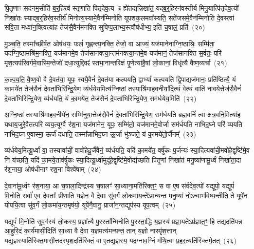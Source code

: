 पि॒तृ॒णाꣳ सद॑नम॒सीति॑ ब॒र्॒\mbox{}हिरव॑ स्तृणाति पितृदेव॒त्य ꣴ॒ ह्ये॑तद्यन्निखा॑तं॒ यद्ब॒र्॒\mbox{}हिरन॑वस्तीर्य मिनु॒यात्पि॑तृदेव॒त्यो॑ निखा॑तः स्याद्ब॒र्॒\mbox{}हिर॑व॒स्तीर्य॑ मिनोत्य॒स्यामे॒वैन॑म्मिनोति यूपशक॒लमवा᳚स्यति॒ सते॑जसमे॒वैन॑म्मिनोति दे॒वस्त्वा॑ सवि॒ता मध्वा॑न॒क्त्वित्या॑ह॒ तेज॑सै॒वैन॑मनक्ति सुपिप्प॒लाभ्य॒स्त्वौष॑धीभ्य॒ इति॑ च॒षालं॒ प्रति॑~(२०)

मु॒ञ्च॒ति॒ तस्मा᳚च्छीर्\mbox{}ष॒त ओष॑धयः॒ फलं॑ गृह्णन्त्य॒नक्ति॒ तेजो॒ वा आज्यं॒ यज॑मानेनाग्नि॒ष्ठाश्रिः॒ सम्मि॑ता॒ यद॑ग्नि॒ष्ठा\-मश्रि॑म॒नक्ति॒ यज॑मानमे॒व तेज॑सानक्त्या॒न्तम॑नक्त्या॒न्तमे॒व यज॑मानं॒ तेज॑सानक्ति स॒र्वतः॒ परि॑ मृश॒त्यप॑रिवर्गमे॒वा\-स्मि॒न्तेजो॑ दधा॒त्युद्दिवꣴ॑ स्तभा॒नान्तरि॑क्षं पृ॒णेत्या॑है॒षां लो॒कानां॒ विधृ॑त्यै वैष्ण॒व्यर्चा~(२१)

क॒ल्प॒य॒ति॒ वै॒ष्ण॒वो वै दे॒वत॑या॒ यूपः॒ स्वयै॒वैनं॑ दे॒वत॑या कल्पयति॒ द्वा\-भ्यां᳚ कल्पयति द्वि॒पाद्यज॑मानः॒ प्रति॑ष्ठित्यै॒ यं का॒मये॑त॒ तेज॑सैनं दे॒वता॑भिरिन्द्रि॒येण॒ व्य॑र्धयेय॒मित्य॑ग्नि॒ष्ठां तस्याश्रि॑माहव॒नीया॑दि॒त्थं वे॒त्थं वाति॑ नावये॒त्तेज॑सै॒वैनं॑ दे॒वता॑भिरिन्द्रि॒येण॒ व्य॑र्धयति॒ यं का॒मये॑त॒ तेज॑सैनं दे॒वता॑भिरिन्द्रि॒येण॒ सम॑र्धयेय॒मिति॑~(२२)

अ॒ग्नि॒ष्ठां तस्याश्रि॑माहव॒नीये॑न॒ सम्मि॑नुया॒त्तेज॑सै॒वैनं॑ दे॒वता॑भिरिन्द्रि॒येण॒ सम॑र्धयति ब्रह्म॒वनिं॑ त्वा क्षत्र॒वनि॒मित्या॑ह यथाय॒जुरे॒वैतत्परि॑ व्यय॒त्यूर्ग्वै र॑श॒ना यज॑मानेन॒ यूपः॒ सम्मि॑तो॒ यज॑मानमे॒वोर्जा सम॑र्धयति नाभिद॒घ्ने परि॑ व्ययति नाभिद॒घ्न ए॒वास्मा॒ ऊर्जं॑ दधाति॒ तस्मा᳚न्नाभिद॒घ्न ऊ॒र्जा भु॑ञ्जते॒ यं का॒मये॑तो॒र्जैनम्᳚~(२३)

व्य॑र्धयेय॒मित्यू॒र्ध्वां वा॒ तस्यावा॑चीं॒ वावो॑हेदू॒र्जैवैनं॒ व्य॑र्धयति॒ यदि॑ का॒मये॑त॒ वर्\mbox{}षु॑कः प॒र्जन्यः॑ स्या॒दित्यवा॑ची॒मवो॑हे॒\-द्वृष्टि॑मे॒व नि य॑च्छति॒ यदि॑ का॒मये॒ताव॑र्\mbox{}षुकः स्या॒दित्यू॒र्ध्वामुदू॑हे॒द्वृष्टि॑मे॒वोद्य॑च्छति पितृ॒णां निखा॑तं मनु॒ष्या॑णामू॒र्ध्वं निखा॑ता॒दा र॑श॒नाया॒ ओष॑धीनाꣳ रश॒ना विश्वे॑षाम्~(२४)

दे॒वाना॑मू॒र्ध्वꣳ र॑श॒नाया॒ आ च॒षाला॒दिन्द्र॑स्य च॒षालꣳ॑ सा॒ध्याना॒मति॑रिक्त॒ꣳ॒ स वा ए॒ष स॑र्वदेव॒त्यो॑ यद्यूपो॒ यद्यूपं॑ मि॒नोति॒ सर्वा॑ ए॒व दे॒वताः᳚ प्रीणाति य॒ज्ञेन॒ वै दे॒वाः सु॑व॒र्गं लो॒कमा॑य॒न्ते॑\-ऽमन्यन्त मनु॒ष्या॑ नो॒\-ऽन्वाभ॑विष्य॒न्तीति॒ ते यूपे॑न योपयि॒त्वा सु॑व॒र्गं लो॒कमा॑य॒न्तमृष॑यो॒ यूपे॑नै॒वानु॒ प्राजा॑न॒न्तद्यूप॑स्य यूप॒त्वम्~(२५)

यद्यूपं॑ मि॒नोति॑ सुव॒र्गस्य॑ लो॒कस्य॒ प्रज्ञा᳚त्यै पु॒रस्ता᳚न्मिनोति पु॒रस्ता॒द्धि य॒ज्ञस्य॑ प्रज्ञा॒यते\-ऽप्र॑ज्ञात॒ꣳ॒ हि तद्यदति॑पन्न आ॒हुरि॒दं का॒र्य॑मासी॒दिति॑ सा॒ध्या वै दे॒वा य॒ज्ञमत्य॑मन्यन्त॒ तान् य॒ज्ञो नास्पृ॑श॒त्तान् यद्य॒ज्ञस्याति॑रिक्त॒मासी॒त्तद॑स्पृश॒\-दति॑रिक्तं॒ वा ए॒तद्य॒ज्ञस्य॒ यद॒ग्नाव॒ग्निं म॑थि॒त्वा प्र॒हर॒त्यति॑रिक्तमे॒तत्~(२६)

